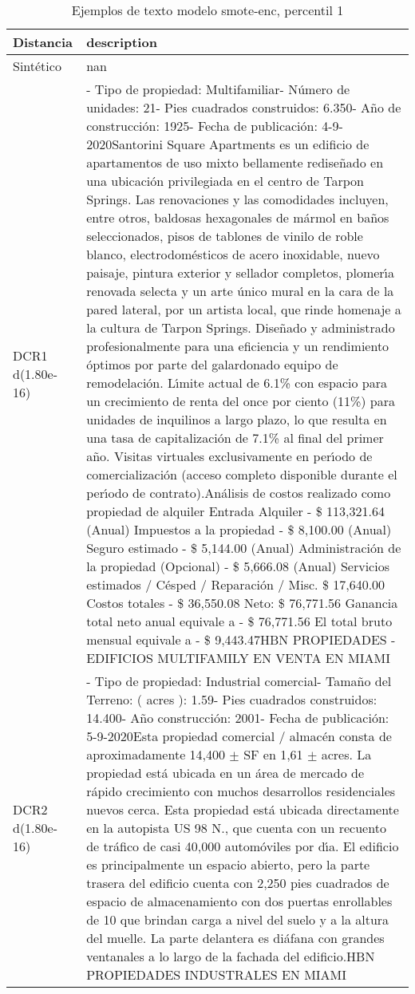\begin{table}[H]
\centering
\fontsize{10}{14}\selectfont
\caption{Ejemplos de texto modelo smote-enc, percentil 1}
\label{table-example-economicos-b-3-smote-enc-1p-text}
\begin{tabular}{|l|m{35em}|}
\hline
\rowcolor[gray]{0.8}
Distancia & description \\
\hline Sintético & nan \\
\hline DCR1 d(1.80e-16) & - Tipo de propiedad: Multifamiliar- N\'umero de unidades: 21- Pies cuadrados construidos: 6.350- A\~no de construcci\'on: 1925- Fecha de publicaci\'on: 4-9-2020Santorini Square Apartments es un edificio de apartamentos de uso mixto bellamente redise\~nado en una ubicaci\'on privilegiada en el centro de Tarpon Springs. Las renovaciones y las comodidades incluyen, entre otros, baldosas hexagonales de m\'armol en ba\~nos seleccionados, pisos de tablones de vinilo de roble blanco, electrodom\'esticos de acero inoxidable, nuevo paisaje, pintura exterior y sellador completos, plomer{\'\i}a renovada selecta y un arte \'unico mural en la cara de la pared lateral, por un artista local, que rinde homenaje a la cultura de Tarpon Springs. Dise\~nado y administrado profesionalmente para una eficiencia y un rendimiento \'optimos por parte del galardonado equipo de remodelaci\'on. L{\'\i}mite actual de 6.1\% con espacio para un crecimiento de renta del once por ciento (11\%) para unidades de inquilinos a largo plazo, lo que resulta en una tasa de capitalizaci\'on de 7.1\% al final del primer a\~no. Visitas virtuales exclusivamente en per{\'\i}odo de comercializaci\'on (acceso completo disponible durante el per{\'\i}odo de contrato).An\'alisis de costos realizado como propiedad de alquiler Entrada Alquiler - \$ 113,321.64 (Anual) Impuestos a la propiedad - \$ 8,100.00 (Anual) Seguro estimado - \$ 5,144.00 (Anual) Administraci\'on de la propiedad (Opcional) - \$ 5,666.08 (Anual) Servicios estimados / C\'esped / Reparaci\'on / Misc. \$ 17,640.00 Costos totales - \$ 36,550.08 Neto: \$ 76,771.56 Ganancia total neto anual equivale a - \$ 76,771.56 El total bruto mensual equivale a - \$ 9,443.47HBN PROPIEDADES - EDIFICIOS MULTIFAMILY EN VENTA EN MIAMI \\
\hline DCR2 d(1.80e-16) & - Tipo de propiedad: Industrial comercial- Tama\~no del Terreno: ( acres ): 1.59- Pies cuadrados construidos: 14.400- A\~no construcci\'on: 2001- Fecha de publicaci\'on: 5-9-2020Esta propiedad comercial / almac\'en consta de aproximadamente 14,400 \ensuremath{\pm} SF en 1,61 \ensuremath{\pm} acres. La propiedad est\'a ubicada en un \'area de mercado de r\'apido crecimiento con muchos desarrollos residenciales nuevos cerca. Esta propiedad est\'a ubicada directamente en la autopista US 98 N., que cuenta con un recuento de tr\'afico de casi 40,000 autom\'oviles por d{\'\i}a. El edificio es principalmente un espacio abierto, pero la parte trasera del edificio cuenta con 2,250 pies cuadrados de espacio de almacenamiento con dos puertas enrollables de 10 que brindan carga a nivel del suelo y a la altura del muelle. La parte delantera es di\'afana con grandes ventanales a lo largo de la fachada del edificio.HBN PROPIEDADES INDUSTRALES EN MIAMI \\
\hline
\end{tabular}
\end{table}
